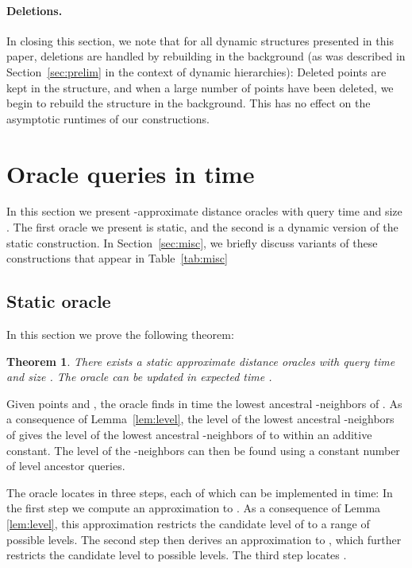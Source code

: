 \documentclass[11pt]{article}
\newtheorem{theorem}{Theorem}
\begin{document}
\paragraph{Deletions.} In closing this section, we note that for all dynamic 
structures
presented in this paper, deletions are handled by rebuilding in the background
(as was described in Section~\ref{sec:prelim} in the context of dynamic hierarchies):
Deleted points are kept in the structure, and when a large number of points have been deleted,
we begin to rebuild the structure in the background. This has no effect on the asymptotic
runtimes of our constructions.



\section{Oracle queries in  time}\label{sec:main}
In this section we present -approximate distance oracles with 
query time and size . The
first oracle we present is static, and the second is a dynamic version of the
static construction. In Section~\ref{sec:misc}, we briefly discuss variants of these 
constructions that appear in Table~\ref{tab:misc}


\subsection{Static oracle}\label{sec:main-static}

In this section we prove the following theorem:
\begin{theorem}\label{thm:static-oracle}
There exists a static  approximate distance oracles with 
query time and size . The
oracle can be updated in expected time
.
\end{theorem}

Given points  and , the oracle finds in  time the lowest ancestral
-neighbors  of . As a consequence of Lemma~\ref{lem:level}, the
level of the lowest ancestral -neighbors of  gives the level of the
lowest ancestral -neighbors of  to within an additive constant. 
The level of the -neighbors can then be found using a constant number of level
ancestor queries.

The oracle locates  in three steps, each of which can be implemented in 
time: In the first step we compute an  approximation to .
As a consequence of Lemma \ref{lem:level}, this approximation restricts the
candidate level of  to a range of  possible levels.
The second step then derives an  approximation to ,
which further restricts the candidate level to  possible
levels. The third step locates .
\end{document}
